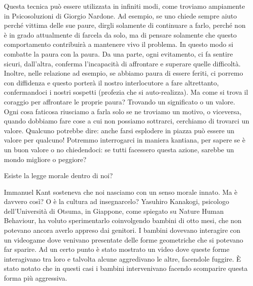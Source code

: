 \documentclass[12pt]{book} %
\begin{document}
Questa tecnica può essere utilizzata in infiniti modi, come troviamo ampiamente in
Psicosoluzioni di Giorgio Nardone. Ad esempio, se uno chiede sempre
aiuto perché vittima delle sue paure, dirgli solamente di continuare a farlo, perché non è in grado attualmente di
farcela da solo, ma di pensare solamente che questo comportamento contribuirà a mantenere vivo il problema. In questo
modo si combatte la paura con la paura. Da una parte, ogni evitamento, ci fa sentire sicuri,
dall'altra, conferma l'incapacità di affrontare e superare quelle difficoltà.
Inoltre, nelle relazione ad esempio, se abbiamo paura di essere feriti, ci porremo con diffidenza e questo porterà il
nostro interlocutore a fare altrettanto, confermandoci i nostri sospetti (profezia che si auto-realizza). Ma come si
trova il coraggio per affrontare le proprie paura? Trovando un significato o un valore. Ogni cosa faticosa riusciamo a
farla solo se ne troviamo un motivo, o viceversa, quando dobbiamo fare cose a cui non possiamo sottrarci, cerchiamo di
trovarci un valore. Qualcuno potrebbe dire: anche farsi esplodere in piazza può essere un valore per qualcuno! Potremmo
interrogarci in maniera kantiana, per sapere se è un buon valore o no chiedendoci: se tutti facessero questa azione,
sarebbe un mondo migliore o peggiore?

\begin{mdframed}[linewidth=1pt]
Esiste la legge morale dentro di noi?

Immanuel Kant sosteneva che noi nasciamo con un senso morale innato. Ma è davvero così? O è la cultura ad insegnarcelo?
Yasuhiro Kanakogi, psicologo dell'Università di Otsuma, in Giappone, come spiegato su Nature Human
Behaviour, ha voluto sperimentarlo coinvolgendo bambini di otto mesi, che
non potevano ancora averlo appreso dai genitori. I bambini dovevano interagire con un videogame dove venivano
presentate delle forme geometriche che si potevano far sparire. Ad un certo punto è stato mostrato un video dove queste
forme interagivano tra loro e talvolta alcune aggredivano le altre, facendole fuggire. È stato notato che in questi
casi i bambini intervenivano facendo scomparire questa forma più aggressiva.
\end{mdframed}
\end{document}
